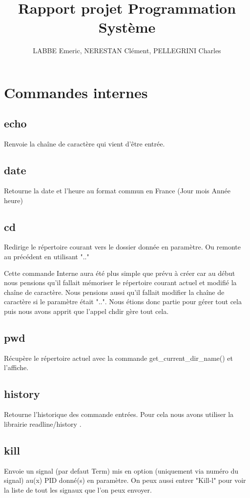\documentclass[12pt]{article}
\author{LABBE Emeric, NERESTAN Clément, PELLEGRINI Charles}
\title{Rapport projet Programmation Système}
\begin{document}
\maketitle
\newpage
\tableofcontents

\newpage
\section{Commandes internes}

\subsection{echo}
Renvoie la chaîne de caractère qui vient d’être entrée.

\subsection{date}
Retourne la date et l'heure au format commun en France (Jour mois Année heure)
\subsection{cd}
Redirige le répertoire courant vers le dossier donnée en paramètre. Ou remonte au précédent en utilisant ".." 

Cette commande Interne aura été plus simple que prévu à créer car au début nous pensions qu'il fallait mémoriser le répertoire courant actuel et modifié la chaîne de caractère. Nous pensions aussi qu'il fallait modifier la chaîne de caractère si le paramètre était "..". Nous étions donc partie pour gérer tout cela puis nous avons apprit que l'appel chdir gère tout cela.
\subsection{pwd}
Récupère le répertoire actuel avec la commande get\_current\_dir\_name() et l'affiche.

\subsection{history}
Retourne l'historique des commande entrées. Pour cela nous avons utiliser la librairie readline/history .

\subsection{kill}
Envoie un signal (par defaut Term) mis en option (uniquement via numéro du signal) au(x) PID donné(s) en paramètre. On peux aussi entrer "Kill-l" pour voir la liste de tout les signaux que l'on peux envoyer.
\end{document}
